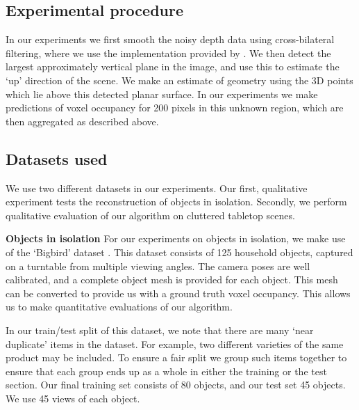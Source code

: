 \documentclass[10pt,twocolumn,letterpaper]{article}
\renewcommand{\paragraph}{\vspace{2pt}\noindent\textbf}
\begin{document}
\subsection{Experimental procedure}

In our experiments we first smooth the noisy depth data using cross-bilateral filtering, where we use the implementation provided by \cite{silberman-eccv-2012}.
We then detect the largest approximately vertical plane in the image, and use this to estimate the `up' direction of the scene.
We make an estimate of geometry using the 3D points which lie above this detected planar surface.
In our experiments we make predictions of voxel occupancy for 200 pixels in this unknown region, which are then aggregated as described above.


\subsection{Datasets used}

We use two different datasets in our experiments.
Our first, qualitative experiment tests the reconstruction of objects in isolation.
Secondly, we perform qualitative evaluation of our algorithm on cluttered tabletop scenes.


\paragraph{Objects in isolation}
For our experiments on objects in isolation, we make use of the `Bigbird' dataset \cite{singh-icra-2014}. 
This dataset consists of 125 household objects, captured on a turntable from multiple viewing angles.
The camera poses are well calibrated, and a complete object mesh is provided for each object.
This mesh can be converted to provide us with a ground truth voxel occupancy.
This allows us to make quantitative evaluations of our algorithm.

In our train/test split of this dataset, we note that there are many `near duplicate' items in the dataset.
For example, two different varieties of the same product may be included.
To ensure a fair split we group such items together to ensure that each group ends up as a whole in either the training or the test section.
Our final training set consists of 80 objects, and our test set 45 objects.
We use 45 views of each object.
\end{document}
